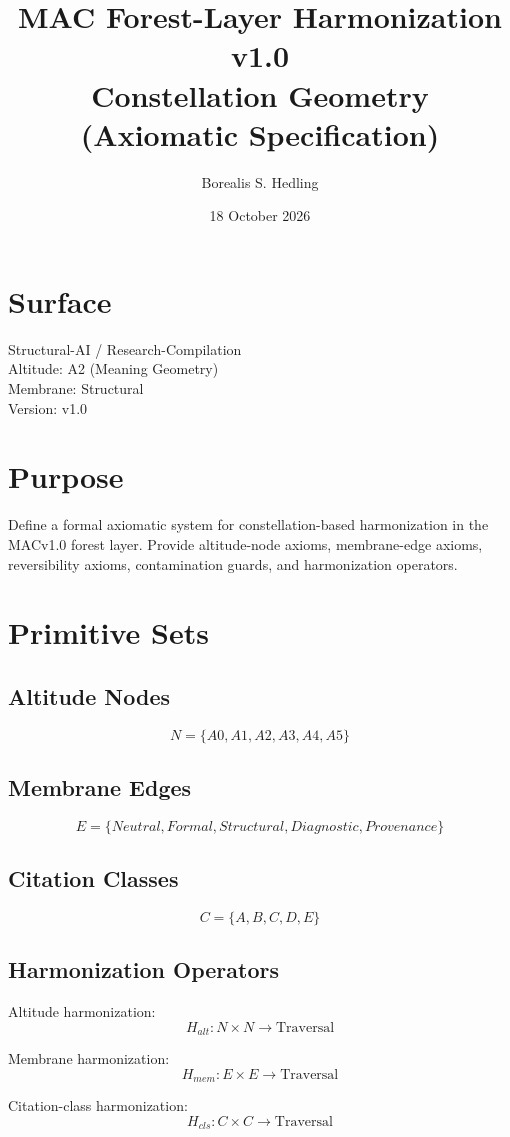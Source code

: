 \documentclass[11pt]{article}
\title{MAC Forest-Layer Harmonization v1.0 \\ Constellation Geometry (Axiomatic Specification)}
\author{Borealis S. Hedling}
\date{18 October 2026}
\begin{document}
\maketitle

\section*{Surface}
Structural-AI / Research-Compilation \\
Altitude: A2 (Meaning Geometry) \\
Membrane: Structural \\
Version: v1.0

\section{Purpose}
Define a formal axiomatic system for constellation-based harmonization in the
MACv1.0 forest layer. Provide altitude-node axioms, membrane-edge axioms,
reversibility axioms, contamination guards, and harmonization operators.

\section{Primitive Sets}

\subsection{Altitude Nodes}
\[
N = \{A0, A1, A2, A3, A4, A5\}
\]

\subsection{Membrane Edges}
\[
E = \{Neutral, Formal, Structural, Diagnostic, Provenance\}
\]

\subsection{Citation Classes}
\[
C = \{A, B, C, D, E\}
\]

\subsection{Harmonization Operators}
Altitude harmonization:
\[
H_{alt} : N \times N \rightarrow \text{Traversal}
\]

Membrane harmonization:
\[
H_{mem} : E \times E \rightarrow \text{Traversal}
\]

Citation-class harmonization:
\[
H_{cls} : C \times C \rightarrow \text{Traversal}
\]
\end{document}

